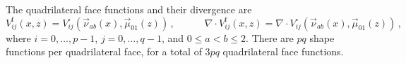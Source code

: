 The quadrilateral face functions and their divergence are
\begin{equation}
		V_{ij}^{\mathrm{f}}(x,z)=V_{ij}^\square(\vec{\nu}_{ab}(x),\vec{\mu}_{01}(z))\,,\qquad\quad
		\nabla\cdot V_{ij}^{\mathrm{f}}(x,z)=\nabla\cdot V_{ij}^\square(\vec{\nu}_{ab}(x),\vec{\mu}_{01}(z))\,,
\end{equation}
where $i=0,\ldots,p-1$, $j=0,\ldots,q-1$, and $0\leq a<b\leq2$. 
There are $pq$ shape functions per quadrilateral face, for a total of $3pq$ quadrilateral face functions.


